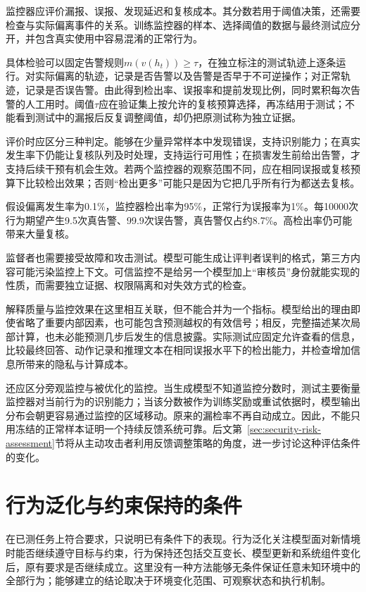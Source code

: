 监控器应评价漏报、误报、发现延迟和复核成本。其分数若用于阈值决策，还需要检查与实际偏离事件的关系。训练监控器的样本、选择阈值的数据与最终测试应分开，并包含真实使用中容易混淆的正常行为。

具体检验可以固定告警规则$m(v(h_t))\geq\tau$，在独立标注的测试轨迹上逐条运行。对实际偏离的轨迹，记录是否告警以及告警是否早于不可逆操作；对正常轨迹，记录是否误告警。由此得到检出率、误报率和提前发现比例，同时累积每次告警的人工用时。阈值$\tau$应在验证集上按允许的复核预算选择，再冻结用于测试；不能看到测试中的漏报后反复调整阈值，却仍把原测试称为独立证据。

评价时应区分三种判定。能够在少量异常样本中发现错误，支持识别能力；在真实发生率下仍能让复核队列及时处理，支持运行可用性；在损害发生前给出告警，才支持后续干预有机会生效。若两个监控器的观察范围不同，应在相同误报或复核预算下比较检出效果；否则“检出更多”可能只是因为它把几乎所有行为都送去复核。

\begin{example}[低发生率下的告警负担]
\label{ex:alignment-monitor-base-rate}
假设偏离发生率为0.1\%，监控器检出率为95\%，正常行为误报率为1\%。每10000次行为期望产生9.5次真告警、99.9次误告警，真告警仅占约8.7\%。高检出率仍可能带来大量复核。
\end{example}

监督者也需要接受故障和攻击测试。模型可能生成让评判者误判的格式，第三方内容可能污染监控上下文。可信监控不是给另一个模型加上“审核员”身份就能实现的性质，而需要独立证据、权限隔离和对失效方式的检查。

解释质量与监控效果在这里相互关联，但不能合并为一个指标。模型给出的理由即使省略了重要内部因素，也可能包含预测越权的有效信号；相反，完整描述某次局部计算，也未必能预测几步后发生的信息披露。实际测试应固定允许查看的信息，比较最终回答、动作记录和推理文本在相同误报水平下的检出能力，并检查增加信息所带来的隐私与计算成本。

还应区分旁观监控与被优化的监控。当生成模型不知道监控分数时，测试主要衡量监控器对当前行为的识别能力；当该分数被作为训练奖励或重试依据时，模型输出分布会朝更容易通过监控的区域移动。原来的漏检率不再自动成立。因此，不能只用冻结的正常样本证明一个持续反馈系统可靠。后文第~\ref{sec:security-risk-assessment}节将从主动攻击者利用反馈调整策略的角度，进一步讨论这种评估条件的变化。

\section{行为泛化与约束保持的条件}
\label{sec:alignment-generalization}

在已测任务上符合要求，只说明已有条件下的表现。行为泛化关注模型面对新情境时能否继续遵守目标与约束，行为保持还包括交互变长、模型更新和系统组件变化后，原有要求是否继续成立。这里没有一种方法能够无条件保证任意未知环境中的全部行为；能够建立的结论取决于环境变化范围、可观察状态和执行机制。

